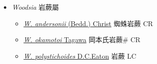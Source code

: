 
  \begin{itemize}
 \item[] \textit{Woodsia} 岩蕨屬
                    
  \begin{itemize}
        \item[] \href{http://www.theplantlist.org/tpl1.1/search?q=Woodsia+andersonii}{\textit{W. andersonii} (Bedd.) Christ}   蜘蛛岩蕨 CR
        \item[] \href{http://www.theplantlist.org/tpl1.1/search?q=Woodsia+okamotoi}{\textit{W. okamotoi} Tagawa}   岡本氏岩蕨\# CR
        \item[] \href{http://www.theplantlist.org/tpl1.1/search?q=Woodsia+polystichoides}{\textit{W. polystichoides} D.C.Eaton}   岩蕨 LC
  \end{itemize}
  \end{itemize}
